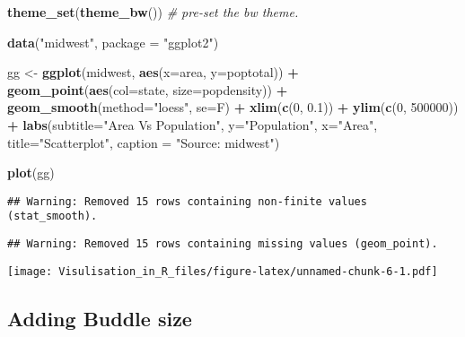 \documentclass[]{article}
\newenvironment{Shaded}{\begin{snugshade}}{\end{snugshade}}
\newcommand{\KeywordTok}[1]{\textcolor[rgb]{0.13,0.29,0.53}{\textbf{#1}}}
\newcommand{\DataTypeTok}[1]{\textcolor[rgb]{0.13,0.29,0.53}{#1}}
\newcommand{\DecValTok}[1]{\textcolor[rgb]{0.00,0.00,0.81}{#1}}
\newcommand{\FloatTok}[1]{\textcolor[rgb]{0.00,0.00,0.81}{#1}}
\newcommand{\StringTok}[1]{\textcolor[rgb]{0.31,0.60,0.02}{#1}}
\newcommand{\CommentTok}[1]{\textcolor[rgb]{0.56,0.35,0.01}{\textit{#1}}}
\newcommand{\OperatorTok}[1]{\textcolor[rgb]{0.81,0.36,0.00}{\textbf{#1}}}
\newcommand{\NormalTok}[1]{#1}
\begin{document}
\begin{Shaded}
\begin{Highlighting}[]
\KeywordTok{theme_set}\NormalTok{(}\KeywordTok{theme_bw}\NormalTok{())  }\CommentTok{# pre-set the bw theme.}

\KeywordTok{data}\NormalTok{(}\StringTok{"midwest"}\NormalTok{, }\DataTypeTok{package =} \StringTok{"ggplot2"}\NormalTok{)}

\NormalTok{gg <-}\StringTok{ }\KeywordTok{ggplot}\NormalTok{(midwest, }\KeywordTok{aes}\NormalTok{(}\DataTypeTok{x=}\NormalTok{area, }\DataTypeTok{y=}\NormalTok{poptotal)) }\OperatorTok{+}\StringTok{ }
\StringTok{  }\KeywordTok{geom_point}\NormalTok{(}\KeywordTok{aes}\NormalTok{(}\DataTypeTok{col=}\NormalTok{state, }\DataTypeTok{size=}\NormalTok{popdensity)) }\OperatorTok{+}\StringTok{ }
\StringTok{  }\KeywordTok{geom_smooth}\NormalTok{(}\DataTypeTok{method=}\StringTok{"loess"}\NormalTok{, }\DataTypeTok{se=}\NormalTok{F) }\OperatorTok{+}\StringTok{ }
\StringTok{  }\KeywordTok{xlim}\NormalTok{(}\KeywordTok{c}\NormalTok{(}\DecValTok{0}\NormalTok{, }\FloatTok{0.1}\NormalTok{)) }\OperatorTok{+}\StringTok{ }
\StringTok{  }\KeywordTok{ylim}\NormalTok{(}\KeywordTok{c}\NormalTok{(}\DecValTok{0}\NormalTok{, }\DecValTok{500000}\NormalTok{)) }\OperatorTok{+}\StringTok{ }
\StringTok{  }\KeywordTok{labs}\NormalTok{(}\DataTypeTok{subtitle=}\StringTok{"Area Vs Population"}\NormalTok{, }
       \DataTypeTok{y=}\StringTok{"Population"}\NormalTok{, }
       \DataTypeTok{x=}\StringTok{"Area"}\NormalTok{, }
       \DataTypeTok{title=}\StringTok{"Scatterplot"}\NormalTok{, }
       \DataTypeTok{caption =} \StringTok{"Source: midwest"}\NormalTok{)}

\KeywordTok{plot}\NormalTok{(gg)}
\end{Highlighting}
\end{Shaded}

\begin{verbatim}
## Warning: Removed 15 rows containing non-finite values (stat_smooth).
\end{verbatim}

\begin{verbatim}
## Warning: Removed 15 rows containing missing values (geom_point).
\end{verbatim}

\texttt{[image: Visulisation\_in\_R\_files/figure-latex/unnamed-chunk-6-1.pdf]}

\subsection{Adding Buddle size}\label{adding-buddle-size}
\end{document}
